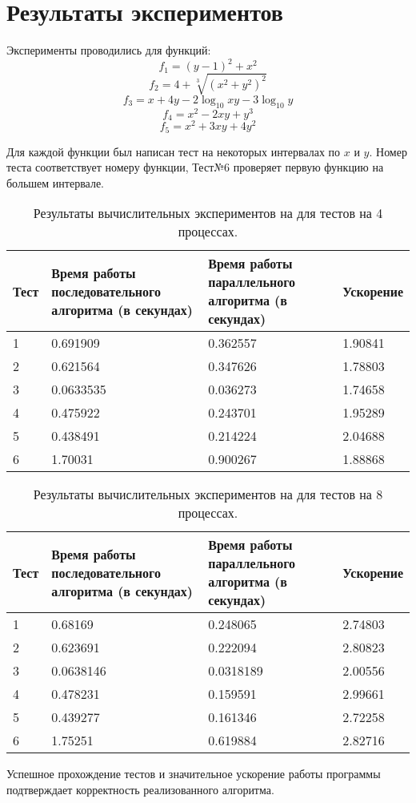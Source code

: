 \documentclass{report}
\begin{document}
\section*{Результаты экспериментов }
Эксперименты проводились для функций:
$$f_1 = (y-1)^2 + x^2$$
$$f_2 = 4 + \sqrt[3]{(x^2+y^2)^2}$$
$$f_3 = x + 4y - 2\log_{10}xy - 3\log_{10}y$$
$$f_4 = x^2 - 2xy + y^3$$
$$f_5 = x^2 + 3xy + 4y^2$$
\par Для каждой функции был написан тест на некоторых интервалах по $x$ и $y$. Номер теста соответствует номеру функции, Тест№6 проверяет первую функцию на большем интервале.
\begin{table}[!h]
\caption{Результаты вычислительных экспериментов на для тестов на 4 процессах. }
\centering
\begin{tabular}{| p{2cm} | p{3cm} | p{4cm} | p{2cm} |}
\hline
Тест & Время работы последовательного алгоритма (в секундах) & Время работы параллельного алгоритма (в секундах) & Ускорение  \\[5pt]
\hline
1        & 0.691909       & 0.362557      & 1.90841       \\
2        & 0.621564       & 0.347626      & 1.78803       \\
3        & 0.0633535      & 0.036273      & 1.74658       \\
4        & 0.475922       & 0.243701      & 1.95289       \\
5        & 0.438491       & 0.214224      & 2.04688       \\
6        & 1.70031        & 0.900267      & 1.88868       \\

\hline
\end{tabular}
\end{table}

\begin{table}[!h]
\caption{Результаты вычислительных экспериментов на для тестов на 8 процессах. }
\centering
\begin{tabular}{| p{2cm} | p{3cm} | p{4cm} | p{2cm} |}
\hline
Тест & Время работы последовательного алгоритма (в секундах) & Время работы параллельного алгоритма (в секундах) & Ускорение  \\[5pt]
\hline
1        & 0.68169        & 0.248065      & 2.74803       \\
2        & 0.623691       & 0.222094      & 2.80823       \\
3        & 0.0638146      & 0.0318189     & 2.00556       \\
4        & 0.478231       & 0.159591      & 2.99661       \\
5        & 0.439277       & 0.161346      & 2.72258       \\
6        & 1.75251        & 0.619884      & 2.82716       \\
\hline
\end{tabular}
\end{table}
\par Успешное прохождение тестов и значительное ускорение работы программы подтверждает корректность реализованного алгоритма.
\newpage
\end{document}
